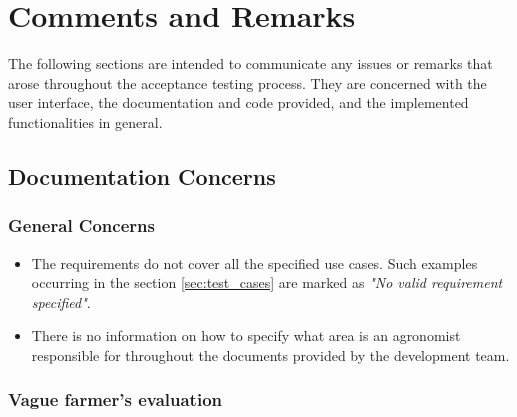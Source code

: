 \chapter{Comments and Remarks} \label{ch:comments_and_remarks}


The following sections are intended to communicate any issues or remarks that arose throughout the acceptance testing process. They are concerned with the user interface, the documentation and code provided, and the implemented functionalities in general.

\section{Documentation Concerns}

\subsection{General Concerns}

\begin{itemize}
    \item The requirements do not cover all the specified use cases. Such examples occurring in the section \ref{sec:test_cases} are marked as \textit{"No valid requirement specified"}.
    \item There is no information on how to specify what area is an agronomist responsible for throughout the documents provided by the development team.
\end{itemize}

\subsection{Vague farmer's evaluation}

